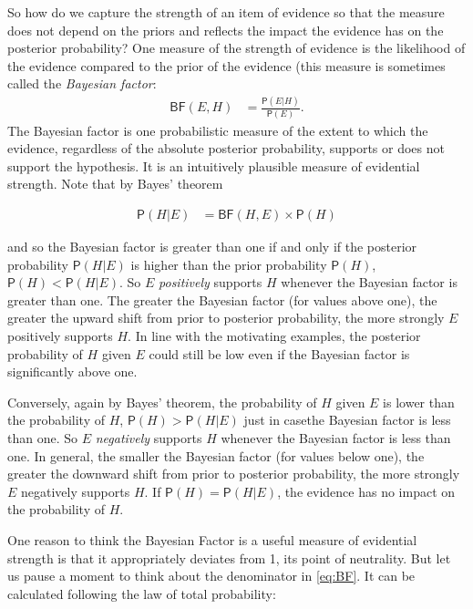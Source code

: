 \documentclass[10pt,dvipsnames,enabledeprecatedfontcommands]{scrartcl}
\newcommand{\pr}[1]{\mathsf{P}(#1)}
\begin{document}
So how do we capture the strength of an item of evidence so that the
measure does not depend on the priors and reflects the impact the
evidence has on the posterior probability? One measure of the strength
of evidence is the likelihood of the evidence compared to the prior of
the evidence (this measure is sometimes called the
\emph{Bayesian factor}: \begin{align}\label{eq:BF}
\mathsf{BF}(E,H) & = \frac{\pr{E \vert H}}{\pr{E}}.
\end{align} \noindent The Bayesian factor is one probabilistic measure
of the extent to which the evidence, regardless of the absolute
posterior probability, supports or does not support the hypothesis. It
is an intuitively plausible measure of evidential strength. Note that by
Bayes' theorem

\vspace{-3mm}

\begin{align*}
\pr{H \vert E} & = \mathsf{BF}(H, E) \times \pr{H}
\end{align*}

\noindent and so the Bayesian factor is greater than one if and only if
the posterior probability \(\pr{H \vert E}\) is higher than the prior
probability \(\pr{H}\), \(\pr{H}<\pr{H\vert E}\). So \(E\)
\textit{positively} supports \(H\) whenever the Bayesian factor is
greater than one. The greater the Bayesian factor (for values above
one), the greater the upward shift from prior to posterior probability,
the more strongly \(E\) positively supports \(H\). In line with the
motivating examples, the posterior probability of \(H\) given \(E\)
could still be low even if the Bayesian factor is significantly above
one.

Conversely, again by Bayes' theorem, the probability of \(H\) given
\(E\) is lower than the probability of \(H\), \(\pr{H}>\pr{H\vert E}\)
just in casethe Bayesian factor is less than one. So \(E\)
\textit{negatively} supports \(H\) whenever the Bayesian factor is less
than one. In general, the smaller the Bayesian factor (for values below
one), the greater the downward shift from prior to posterior
probability, the more strongly \(E\) negatively supports \(H\). If
\(\pr{H}=\pr{H\vert E}\), the evidence has no impact on the probability
of \(H\).

One reason to think the Bayesian Factor is a useful measure of
evidential strength is that it appropriately deviates from 1, its point
of neutrality. But let us pause a moment to think about the denominator
in \eqref{eq:BF}. It can be calculated following the law of total
probability:
\end{document}
